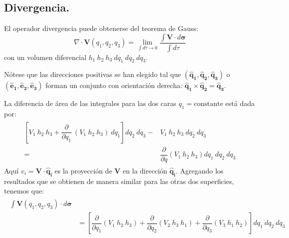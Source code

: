 \subsection{Divergencia.}
El operador divergencia puede obtenerse del teorema de Gauss:
\begin{equation}
\nabla \cdot \mathbf{V}(q_{1},q_{2},q_{3}) = \lim_{\int d \tau \to 0} \dfrac{\int \mathbf{V}\cdot d \bm{\sigma}}{\int d \tau}
\label{eq:ecuacion_02_19}
\end{equation}
con un volumen diferencial $h_{1} \: h_{2} \: h_{3} \: dq_{1} \: dq_{2} \: dq_{3}$.
\par
Nótese que las direcciones positivas se han elegido tal que $(\mathbf{\widehat{q}_{1}},\mathbf{\widehat{q}_{2}}, \mathbf{\widehat{q}_{3}})$ o $(\mathbf{\widehat{e}_{1}},\mathbf{\widehat{e}_{2}}, \mathbf{\widehat{e}_{3}})$ forman un conjunto con orientación derecha: $\mathbf{\widehat{q}_{1}} \times\mathbf{\widehat{q}_{2}} = \mathbf{\widehat{q}_{3}}$.
\par
La diferencia de área de las integrales para las dos caras $q_{1} = \text{constante}$ está dada por:
\begin{eqnarray}
\begin{aligned}
\left[ V_{1} \: h_{2} \: h_{3} + \dfrac{\partial}{\partial q_{1}} \: (V_{1} \: h_{2} \: h_{3}) \: dq_{1} \right] dq_{2} \: dq_{3} -& V_{1} \: h_{2} \: h_{3} \: dq_{2} \: dq_{3} \\
=& \dfrac{\partial}{\partial q} (V_{1} \: h_{2} \: h_{3}) dq_{1} \: dq_{2} \: dq_{3}
\end{aligned}
\label{eq:ecuacion_02_20}
\end{eqnarray}
Aquí  $v_{i} = \mathbf{V} \cdot \mathbf{\widehat{q}_{i}}$ es la proyección de $\mathbf{V}$ en la dirección  $\mathbf{\widehat{q}_{i}}$. Agregando los resultados que se obtienen de manera similar para las otras dos superficies, tenemos que:
\begin{eqnarray}
\begin{aligned}
\int \mathbf{V}(q_{1}, q_{2}, q_{3}) \cdot d \bm{\sigma}  \\
&= \left[ \dfrac{\partial}{\partial q_{1}} (V_{1} \: h_{2} \: h_{3}) + \dfrac{\partial}{\partial q_{2}} (V_{2} \: h_{3} \: h_{1}) +
\dfrac{\partial}{\partial q_{3}} (V_{3} \: h_{1} \: h_{2}) \right] dq_{1} \: dq_{2} \: dq_{3}
\end{aligned}
\end{eqnarray}
